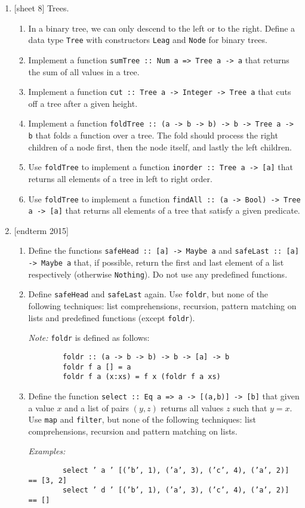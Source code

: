 \documentclass{article}
\def\code#1{\texttt{#1}}
\begin{document}
\begin{enumerate}
    \item {[sheet 8]} Trees.
        \begin{enumerate}
            \item In a binary tree, we can only descend to the left or to the right. Define a data type \code{Tree} with constructors \code{Leag} and \code{Node} for binary trees.
            \item Implement a function \code{sumTree :: Num a => Tree a -> a} that returns the sum of all values in a tree.
            \item Implement a function \code{cut :: Tree a -> Integer -> Tree a} that cuts off a tree after a given height.
            \item Implement a function \code{foldTree :: (a -> b -> b) -> b -> Tree a -> b} that folds a function over a tree. The fold should process the right children of a node first, then the node itself, and lastly the left children.
            \item Use \code{foldTree} to implement a function \code{inorder :: Tree a -> [a]} that returns all elements of a tree in left to right order.
            \item Use \code{foldTree} to implement a function \code{findAll :: (a -> Bool) -> Tree a -> [a]} that returns all elements of a tree that satisfy a given predicate.
        \end{enumerate}

    \item {[endterm 2015]}
        \begin{enumerate}
            \item Define the functions \code{safeHead :: [a] -> Maybe a} and \code{safeLast :: [a] -> Maybe a} that, if possible, return the first and last element of a list respectively (otherwise \code{Nothing}). Do not use any predefined functions.
            \item Define \code{safeHead} and \code{safeLast} again. Use \code{foldr}, but none of the following techniques: list comprehensions, recursion, pattern matching on lists and predefined functions (except \code{foldr}). \par
            \textit{Note:} \code{foldr} is defined as follows:
            \begin{verbatim}
        foldr :: (a -> b -> b) -> b -> [a] -> b
        foldr f a [] = a
        foldr f a (x:xs) = f x (foldr f a xs)
            \end{verbatim}
            \item Define the function \code{select :: Eq a => a -> [(a,b)] -> [b]} that given a value $x$ and a list of pairs $(y,z)$ returns all values $z$ such that $y = x$. Use \code{map} and \code{filter}, but none of the following techniques: list comprehensions, recursion and pattern matching on lists. \par
            \textit{Examples:}
            \begin{verbatim}
        select ’ a ’ [(’b’, 1), (’a’, 3), (’c’, 4), (’a’, 2)] == [3, 2]
        select ’ d ’ [(’b’, 1), (’a’, 3), (’c’, 4), (’a’, 2)] == []
            \end{verbatim}
        \end{enumerate}


\end{enumerate}
\end{document}
